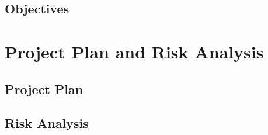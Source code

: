 \documentclass[runningheads]{llncs}
\begin{document}
\subsection{Objectives}

\section{Project Plan and Risk Analysis}

\subsection{Project Plan}

\subsection{Risk Analysis}

\begin{thebibliography}{8}

\end{thebibliography}
\end{document}
